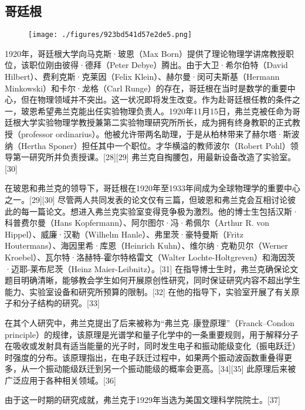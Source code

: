 \subsection{哥廷根}
\begin{figure}[ht]
\centering
\texttt{[image: ./figures/923bd541d57e2de5.png]}
\caption{} \label{fig_ZMSflk_2}
\end{figure}
1920年，哥廷根大学向马克斯·玻恩（Max Born）提供了理论物理学讲席教授职位，该职位刚由彼得·德拜（Peter Debye）腾出。由于大卫·希尔伯特（David Hilbert）、费利克斯·克莱因（Felix Klein）、赫尔曼·闵可夫斯基（Hermann Minkowski）和卡尔·龙格（Carl Runge）的存在，哥廷根在当时是数学的重要中心，但在物理领域并不突出。这一状况即将发生改变。作为赴哥廷根任教的条件之一，玻恩希望弗兰克能出任实验物理负责人。1920年11月15日，弗兰克被任命为哥廷根大学实验物理学教授兼第二实验物理研究所所长，成为拥有终身教职的正式教授（professor ordinarius）。他被允许带两名助理，于是从柏林带来了赫尔塔·斯波纳（Hertha Sponer）担任其中一个职位。才华横溢的教师波尔（Robert Pohl）领导第一研究所并负责授课。[28][29] 弗兰克自掏腰包，用最新设备改造了实验室。[30]

在玻恩和弗兰克的领导下，哥廷根在1920年至1933年间成为全球物理学的重要中心之一。[29][30] 尽管两人共同发表的论文仅有三篇，但玻恩和弗兰克会互相讨论彼此的每一篇论文。想进入弗兰克实验室变得竞争极为激烈。他的博士生包括汉斯·科普费尔曼（Hans Kopfermann）、阿尔图尔·冯·希佩尔（Arthur R. von Hippel）、威廉·汉勒（Wilhelm Hanle）、弗里茨·豪特曼斯（Fritz Houtermans）、海因里希·库恩（Heinrich Kuhn）、维尔纳·克勒贝尔（Werner Kroebel）、瓦尔特·洛赫特-霍尔特格雷文（Walter Lochte-Holtgreven）和海因茨·迈耶-莱布尼茨（Heinz Maier-Leibnitz）。[31] 在指导博士生时，弗兰克确保论文题目明确清晰，能够教会学生如何开展原创性研究，同时保证研究内容不超出学生能力、实验室设备和研究所预算的限制。[32] 在他的指导下，实验室开展了有关原子和分子结构的研究。[33]

在其个人研究中，弗兰克提出了后来被称为“弗兰克–康登原理”（Franck–Condon principle）的规律，该原理是光谱学和量子化学中的一条重要规则，用于解释分子在吸收或发射具有适当能量的光子时，同时发生电子和振动能级变化（振电跃迁）时强度的分布。该原理指出，在电子跃迁过程中，如果两个振动波函数重叠得更多，从一个振动能级跃迁到另一个振动能级的概率会更高。[34][35] 此原理后来被广泛应用于各种相关领域。[36]

由于这一时期的研究成就，弗兰克于1929年当选为美国文理科学院院士。[37]
